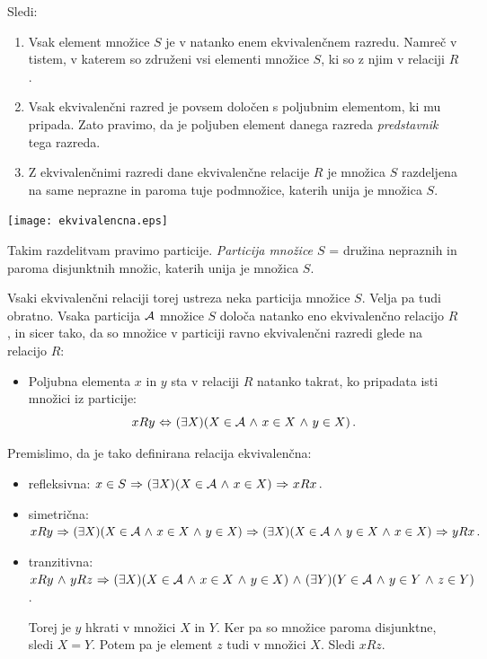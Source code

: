 \documentclass[11pt,paper=b5,footinclude,headinclude]{scrbook} %
\def\inn {{~\wedge~}}
\def\sledi {{~\Rightarrow~}}
\def\cee {{~\Leftrightarrow~}}
\begin{document}
Sledi:
\begin{enumerate}
  \item Vsak element množice $S$ je v natanko enem ekvivalenčnem razredu. Namreč v tistem, v katerem so združeni vsi elementi množice $S$, ki so z njim v relaciji $R$.
  \item Vsak ekvivalenčni razred je povsem določen s poljubnim elementom, ki mu pripada. Zato pravimo, da je poljuben element danega razreda {\em predstavnik} tega razreda.
      \item Z ekvivalenčnimi razredi dane ekvivalenčne relacije $R$ je množica $S$
      razdeljena na same neprazne in paroma tuje podmnožice, katerih unija je množica $S$.
      \end{enumerate}


\begin{center}
\texttt{[image: ekvivalencna.eps]}
\end{center}

Takim razdelitvam pravimo particije. {\em Particija množice $S$} = družina nepraznih in paroma disjunktnih množic, katerih unija je množica $S$.

Vsaki ekvivalenčni relaciji torej ustreza neka particija množice $S$.
Velja pa tudi obratno. Vsaka particija ${\cal A}$ množice $S$ določa natanko eno ekvivalenčno relacijo $R$, in sicer tako, da so množice v particiji ravno ekvivalenčni razredi glede na relacijo $R$:
\begin{itemize}
  \item Poljubna elementa $x$ in $y$ sta v relaciji $R$ natanko takrat, ko pripadata isti množici iz particije:
      $$xRy\cee (\exists X)(X\in {\cal A}\inn x\in X\inn y\in X)\,.$$
\end{itemize}
Premislimo, da je tako definirana relacija ekvivalenčna:
\begin{itemize}
  \item refleksivna: $x\in S \sledi (\exists X)(X\in {\cal A}\inn x\in X)\sledi xRx\,.$
  \item simetrična:
  $xRy\sledi (\exists X)(X\in {\cal A}\inn x\in X\inn y\in X)
  \sledi (\exists X)(X\in {\cal A}\inn y\in X\inn x\in X)\sledi yRx\,.$
  \item tranzitivna:
  $xRy \inn yRz\sledi (\exists X)(X\in {\cal A}\inn x\in X\inn y\in X)
  \inn (\exists Y)(Y\in {\cal A}\inn y\in Y\inn z\in Y)$.

  Torej je $y$ hkrati v množici $X$ in $Y$. Ker pa so množice paroma disjunktne, sledi
  $X = Y$. Potem pa je element $z$ tudi v množici $X$. Sledi $xRz$.
\end{itemize}
\end{document}
